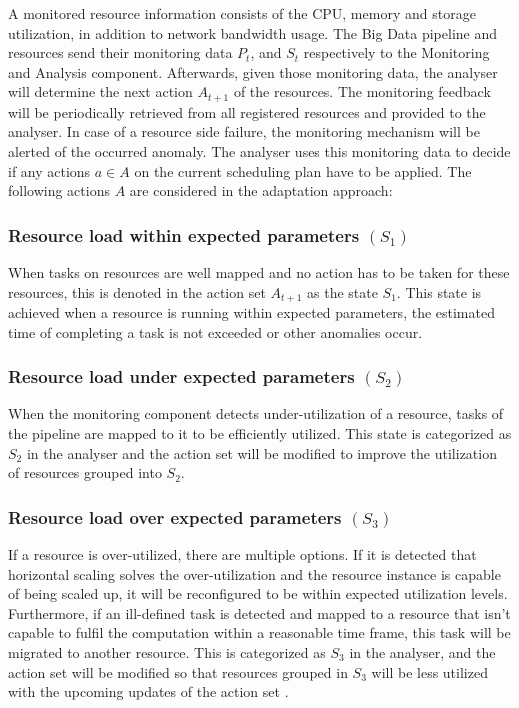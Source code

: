       A monitored resource information consists of the CPU, memory and storage utilization, in addition to network bandwidth usage.
      The Big Data pipeline and resources send their monitoring data $P_t$, and $S_t$ respectively to the Monitoring and Analysis component.
      Afterwards, given those monitoring data, the analyser will determine the next action $A_{t+1}$ of the resources.
      The monitoring feedback will be periodically retrieved from all registered resources and provided to the analyser.
      In case of a resource side failure, the monitoring mechanism will be alerted of the occurred anomaly.  
      The analyser uses this monitoring data to decide if any actions $a \in A$ on the current scheduling plan have to be applied.
      The following actions $A$ are considered in the adaptation approach:

      \subsubsection*{Resource load within expected parameters $(S_1)$} 

        When tasks on resources are well mapped and no action has to be taken for these resources, this is denoted in the action set $A_{t+1}$ as the state $S_1$. This state is achieved when a resource is running within expected parameters, the estimated time of completing a task is not exceeded or other anomalies occur.

      \subsubsection*{Resource load under expected parameters $(S_2)$}

        When the monitoring component detects under-utilization of a resource, tasks of the pipeline are mapped to it to be efficiently utilized. This state is categorized as $S_2$ in the analyser and the action set will be modified to improve the utilization of resources grouped into $S_2$. 

      \subsubsection*{Resource load over expected parameters $(S_3)$} 

        If a resource is over-utilized, there are multiple options. If it is detected that horizontal scaling solves the over-utilization and the resource instance is capable of being scaled up, it will be reconfigured to be within expected utilization levels. Furthermore, if an ill-defined task is detected and mapped to a resource that isn't capable to fulfil the computation within a reasonable time frame, this task will be migrated to another resource. 
        This is categorized as $S_3$ in the analyser, and the action set will be modified so that resources grouped in $S_3$ will be less utilized with the upcoming updates of the action set \cite{kimovskiBigDataPipeline2022}.


